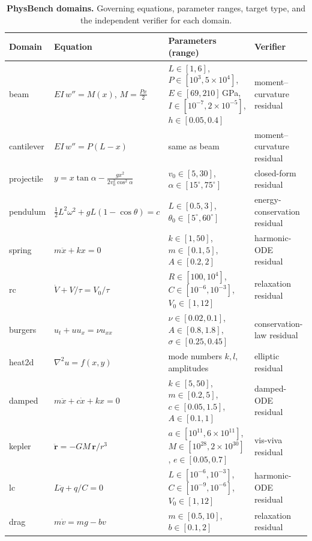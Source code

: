 \documentclass[11pt,a4paper]{article}
\begin{document}
\begin{table}[t]
\centering
\caption{\textbf{PhysBench domains.} Governing equations, parameter ranges,
target type, and the independent verifier for each domain.}
\label{tab:domains}
\small
\begin{tabular}{@{}llll@{}}
\toprule
Domain & Equation & Parameters (range) & Verifier \\
\midrule
beam & $EI\,w'' = M(x)$, $M=\frac{Px}{2}$ & $L\in[1,6]$, $P\in[10^3,5\times10^4]$, $E\in[69,210]$\,GPa, $I\in[10^{-7},2\times10^{-5}]$, $h\in[0.05,0.4]$ & moment--curvature residual \\
cantilever & $EI\,w'' = P(L-x)$ & same as beam & moment--curvature residual \\
projectile & $y=x\tan\alpha - \frac{gx^2}{2v_0^2\cos^2\alpha}$ & $v_0\in[5,30]$, $\alpha\in[15^\circ,75^\circ]$ & closed-form residual \\
pendulum & $\frac12 L^2\omega^2 + gL(1-\cos\theta)=c$ & $L\in[0.5,3]$, $\theta_0\in[5^\circ,60^\circ]$ & energy-conservation residual \\
spring & $m\ddot{x}+kx=0$ & $k\in[1,50]$, $m\in[0.1,5]$, $A\in[0.2,2]$ & harmonic-ODE residual \\
rc & $\dot{V}+V/\tau=V_0/\tau$ & $R\in[100,10^4]$, $C\in[10^{-6},10^{-3}]$, $V_0\in[1,12]$ & relaxation residual \\
burgers & $u_t+uu_x=\nu u_{xx}$ & $\nu\in[0.02,0.1]$, $A\in[0.8,1.8]$, $\sigma\in[0.25,0.45]$ & conservation-law residual \\
heat2d & $\nabla^2 u=f(x,y)$ & mode numbers $k,l$, amplitudes & elliptic residual \\
damped & $m\ddot{x}+c\dot{x}+kx=0$ & $k\in[5,50]$, $m\in[0.2,5]$, $c\in[0.05,1.5]$, $A\in[0.1,1]$ & damped-ODE residual \\
kepler & $\ddot{\mathbf{r}}=-GM\,\mathbf{r}/r^3$ & $a\in[10^{11},6\times10^{11}]$, $M\in[10^{28},2\times10^{30}]$, $e\in[0.05,0.7]$ & vis-viva residual \\
lc & $L\ddot{q}+q/C=0$ & $L\in[10^{-6},10^{-3}]$, $C\in[10^{-9},10^{-6}]$, $V_0\in[1,12]$ & harmonic-ODE residual \\
drag & $m\dot{v}=mg-bv$ & $m\in[0.5,10]$, $b\in[0.1,2]$ & relaxation residual \\
\bottomrule
\end{tabular}
\end{table}
\end{document}
